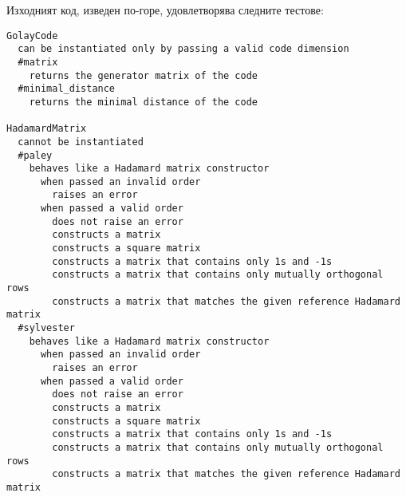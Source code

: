 \documentclass[a4paper,notitlepage,oneside]{report}
\begin{document}
Изходният код, изведен по-горе, удовлетворява следните тестове:

\begin{lstlisting}
GolayCode
  can be instantiated only by passing a valid code dimension
  #matrix
    returns the generator matrix of the code
  #minimal_distance
    returns the minimal distance of the code

HadamardMatrix
  cannot be instantiated
  #paley
    behaves like a Hadamard matrix constructor
      when passed an invalid order
        raises an error
      when passed a valid order
        does not raise an error
        constructs a matrix
        constructs a square matrix
        constructs a matrix that contains only 1s and -1s
        constructs a matrix that contains only mutually orthogonal rows
        constructs a matrix that matches the given reference Hadamard matrix
  #sylvester
    behaves like a Hadamard matrix constructor
      when passed an invalid order
        raises an error
      when passed a valid order
        does not raise an error
        constructs a matrix
        constructs a square matrix
        constructs a matrix that contains only 1s and -1s
        constructs a matrix that contains only mutually orthogonal rows
        constructs a matrix that matches the given reference Hadamard matrix

\end{lstlisting}
\end{document}
